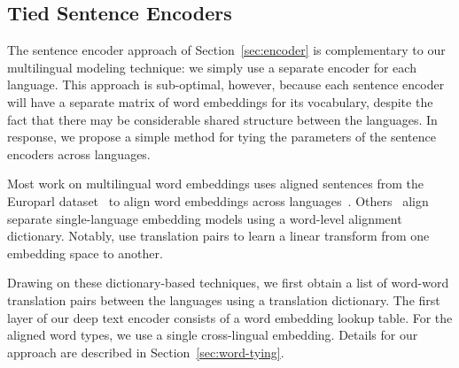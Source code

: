  


\subsection{Tied Sentence Encoders \label{sec:tie-words}}
The sentence encoder approach of Section~\ref{sec:encoder} is complementary to our multilingual modeling technique: we simply use a separate encoder for each language.  This approach is sub-optimal, however, because each sentence encoder will have a separate matrix of word embeddings for its vocabulary, despite the fact that there may be considerable shared structure between the languages. In response, we propose a simple method for tying the parameters of the sentence encoders across languages. 

Most work on multilingual word embeddings uses aligned sentences from the Europarl dataset~\citep{koehn2005europarl} to align word embeddings across languages~\citep{Gouws2015, luong2015bilingual, hermann2014multilingual}. Others~\citep{mikolov2013,
faruqui2014retrofitting} align separate single-language embedding models using a word-level alignment dictionary. Notably, \cite{mikolov2013} use translation pairs to learn a linear transform from one embedding space to another. 

Drawing on these dictionary-based techniques, we first obtain a list of word-word translation pairs between the languages using a translation dictionary. The first layer of our deep text encoder consists of a word embedding lookup table. For the aligned word types, we use a single cross-lingual embedding. Details for our approach are described in Section~\ref{sec:word-tying}.

